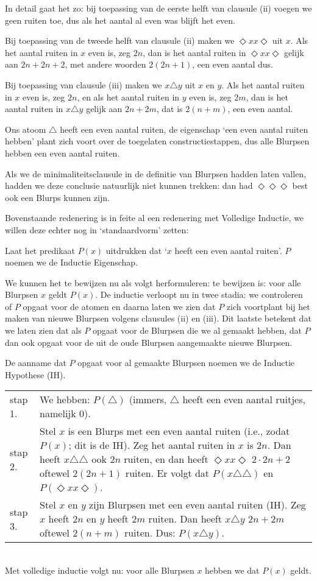 In detail gaat het zo: bij toepassing van de eerste helft van clausule (ii) voegen we geen ruiten toe, dus als het aantal al even was blijft het even.

Bij toepassing van de tweede helft van clausule (ii) maken we $\Diamond xx\Diamond$ uit $x$.
Als het aantal ruiten in $x$ even is, zeg $2n$, dan is het aantal ruiten in $\Diamond xx\Diamond$ gelijk aan $2n+2n+2$, met andere woorden $2(2n+1)$, een even aantal dus. 

Bij toepassing van clausule (iii) maken we $x\triangle y$ uit $x$ en $y$.
Als het aantal ruiten in $x$ even is, zeg $2n$, en als het aantal ruiten in $y$ even is, zeg $2m$, dan is het aantal ruiten in $x\triangle y$ gelijk aan $2n+2m$, dat is $2(n+m)$, een even aantal. 

Ons atoom $\triangle$ heeft een even aantal ruiten, de eigenschap `een even aantal ruiten hebben' plant zich voort over de toegelaten constructiestappen, dus alle Blurpsen hebben een even aantal ruiten.

Als we de minimaliteitsclausule in de definitie van Blurpsen hadden laten vallen, hadden we deze conclusie natuurlijk niet kunnen trekken: dan had $\Diamond\Diamond\Diamond$ best ook een Blurps kunnen zijn.

Bovenstaande redenering is in feite al een redenering met Volledige Inductie, we willen deze echter nog in `standaardvorm' zetten:

\noindent Laat het predikaat $P(x)$ uitdrukken dat `$x$ heeft een even aantal ruiten'. $P$ noemen we de Inductie Eigenschap.

We kunnen het te bewijzen nu als volgt herformuleren: te bewijzen is: voor alle Blurpsen $x$ geldt $P(x)$. De inductie verloopt nu in twee stadia: we controleren of $P$ opgaat voor de atomen en daarna laten we zien dat $P$ zich voortplant bij het maken van nieuwe Blurpsen volgens clausules (ii) en (iii). Dit laatste betekent dat we laten zien dat als $P$ opgaat voor de Blurpsen die we al gemaakt hebben, dat $P$ dan ook opgaat voor de uit de oude Blurpsen aangemaakte nieuwe Blurpsen.

De aanname dat $P$ opgaat voor al gemaakte Blurpsen noemen we de Inductie Hypothese (IH).

\noindent\begin{tabular}{lp{}}
stap 1. & We hebben: $P(\triangle)$ (immers, $\triangle$ heeft een even aantal ruitjes, namelijk 0).\\
stap 2. & Stel $x$ is een Blurps met een even aantal ruiten (i.e., zodat $P(x)$; dit is de IH). Zeg het aantal ruiten in $x$ is $2n$. Dan heeft $x\triangle\triangle$ ook $2n$ ruiten, en dan heeft $\Diamond xx\Diamond$ $2\cdot 2n+2$ oftewel $2(2n+1)$ ruiten. Er volgt dat $P(x\triangle\triangle)$ en $P(\Diamond xx\Diamond)$.\\
stap 3. & Stel $x$ en $y$ zijn Blurpsen met een even aantal ruiten (IH). Zeg $x$ heeft $2n$ en $y$ heeft $2m$ ruiten. Dan heeft $x\triangle y$ $2n+2m$ oftewel $2(n+m)$ ruiten. Dus: $P(x\triangle y)$.
\end{tabular}\\
Met volledige inductie volgt nu: voor alle Blurpsen $x$ hebben we dat $P(x)$ geldt.

